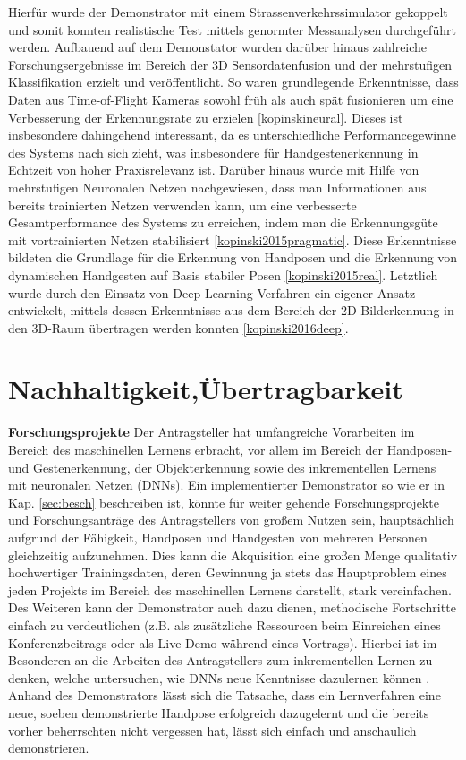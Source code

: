 \documentclass{article}
\begin{document}
Hierfür wurde der Demonstrator mit einem Strassenverkehrssimulator gekoppelt und somit konnten realistische Test mittels genormter Messanalysen durchgeführt werden. Aufbauend auf dem Demonstator wurden darüber hinaus zahlreiche Forschungsergebnisse im Bereich der 3D Sensordatenfusion und der mehrstufigen Klassifikation erzielt und veröffentlicht. So waren grundlegende Erkenntnisse, dass Daten aus Time-of-Flight Kameras sowohl früh als auch spät fusionieren um eine Verbesserung der Erkennungsrate zu erzielen \ref{kopinskineural}. Dieses ist insbesondere dahingehend interessant, da es unterschiedliche Performancegewinne des Systems nach sich zieht, was insbesondere für Handgestenerkennung in Echtzeit von hoher Praxisrelevanz ist. Darüber hinaus wurde mit Hilfe von mehrstufigen Neuronalen Netzen nachgewiesen, dass man Informationen aus bereits trainierten Netzen verwenden kann, um eine verbesserte Gesamtperformance des Systems zu erreichen, indem man die Erkennungsgüte mit vortrainierten Netzen stabilisiert \ref{kopinski2015pragmatic}. Diese Erkenntnisse bildeten die Grundlage für die Erkennung von Handposen und die Erkennung von dynamischen Handgesten auf Basis stabiler Posen \ref{kopinski2015real}. Letztlich wurde durch den Einsatz von Deep Learning Verfahren ein eigener Ansatz entwickelt, mittels dessen Erkenntnisse aus dem Bereich der 2D-Bilderkennung in den 3D-Raum übertragen werden konnten \ref{kopinski2016deep}.  
%
\renewcommand{\thesection}{6}
\section{Nachhaltigkeit,Übertragbarkeit}
\textbf {Forschungsprojekte} Der Antragsteller hat umfangreiche Vorarbeiten im Bereich des maschinellen Lernens erbracht, vor allem im Bereich der Handposen- und Gestenerkennung, der Objekterkennung sowie des inkrementellen Lernens mit neuronalen Netzen (DNNs). 
Ein implementierter Demonstrator so wie er in Kap. \ref{sec:besch} beschreiben ist, könnte für weiter gehende Forschungsprojekte und Forschungsanträge des Antragstellers von großem Nutzen sein, hauptsächlich aufgrund der Fähigkeit, Handposen und Handgesten von mehreren Personen gleichzeitig aufzunehmen. Dies kann die Akquisition eine großen Menge qualitativ hochwertiger Trainingsdaten, deren Gewinnung ja stets das Hauptproblem eines jeden Projekts im Bereich des maschinellen Lernens darstellt, stark vereinfachen. Des Weiteren kann der Demonstrator auch dazu dienen, methodische Fortschritte einfach zu verdeutlichen (z.B. als zusätzliche Ressourcen beim Einreichen eines Konferenzbeitrags oder als Live-Demo während eines Vortrags). Hierbei ist im Besonderen an die Arbeiten des Antragstellers zum inkrementellen Lernen zu denken, welche untersuchen, wie DNNs neue Kenntnisse dazulernen können \cite{xx}. Anhand des Demonstrators lässt sich die Tatsache, dass ein Lernverfahren eine neue, soeben demonstrierte Handpose erfolgreich dazugelernt und die bereits vorher beherrschten nicht vergessen hat, lässt sich einfach und anschaulich demonstrieren.
\end{document}
